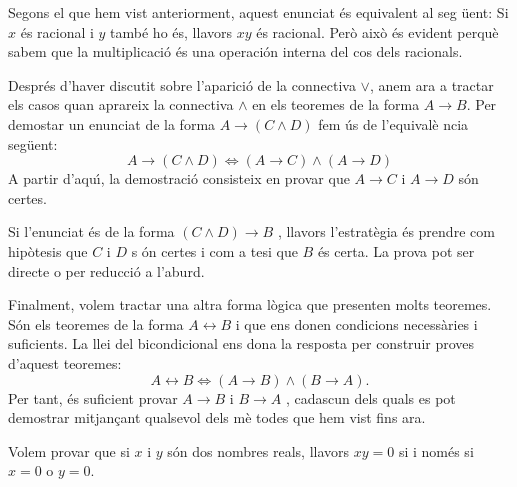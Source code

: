 \begin{solucio}
Segons el que hem vist anteriorment, aquest enunciat \'{e}s equivalent al seg%
\"{u}ent: Si $x$ \'{e}s racional i $y$ tamb\'{e} ho \'{e}s, llavors $xy$
\'{e}s racional. Per\`{o} aix\`{o} \'{e}s evident perqu\`{e} sabem que la
multiplicaci\'{o} \'{e}s una operaci\'{o}n interna del cos dels racionals.
\end{solucio}

\bigskip

Despr\'{e}s d'haver discutit sobre l'aparici\'{o} de la connectiva $\vee$,
anem ara a tractar els casos quan aprareix la connectiva $\wedge$ en els
teoremes de la forma $A\longrightarrow B$. Per demostar un enunciat de la
forma $A\longrightarrow\left( C\wedge D\right) $ fem \'{u}s de l'equival\`{e}%
ncia seg\"{u}ent:%
\begin{equation*}
A\longrightarrow\left( C\wedge D\right) \Longleftrightarrow\left(
A\longrightarrow C\right) \wedge\left( A\longrightarrow D\right)
\end{equation*}
A partir d'aqu\'{\i}, la demostraci\'{o} consisteix en provar que \thinspace$%
A\longrightarrow C$ i $A\longrightarrow D$ s\'{o}n certes.

Si l'enunciat \'{e}s de la forma $\left( C\wedge D\right) \longrightarrow B$%
, llavors l'estrat\`{e}gia \'{e}s prendre com hip\`{o}tesis que $C$ i $D$ s%
\'{o}n certes i com a tesi que $B$ \'{e}s certa. La prova pot ser directe o
per reducci\'{o} a l'aburd.

Finalment, volem tractar una altra forma l\`{o}gica que presenten molts
teoremes. S\'{o}n els teoremes de la forma $A\longleftrightarrow B$ i que
ens donen condicions necess\`{a}ries i suficients. La llei del bicondicional
ens dona la resposta per construir proves d'aquest teoremes:%
\begin{equation*}
A\longleftrightarrow B\Longleftrightarrow\left( A\longrightarrow B\right)
\wedge\left( B\longrightarrow A\right) \text{.}
\end{equation*}
Per tant, \'{e}s suficient provar $A\longrightarrow B$ i $B\longrightarrow A$%
, cadascun dels quals es pot demostrar mitjan\c{c}ant qualsevol dels m\`{e}%
todes que hem vist fins ara.

\begin{exemple}
Volem provar que si $x$ i $y$ s\'{o}n dos nombres reals, llavors $xy=0$ si i nom\'{e}s si $x=0$
o $y=0$.
\end{exemple}

